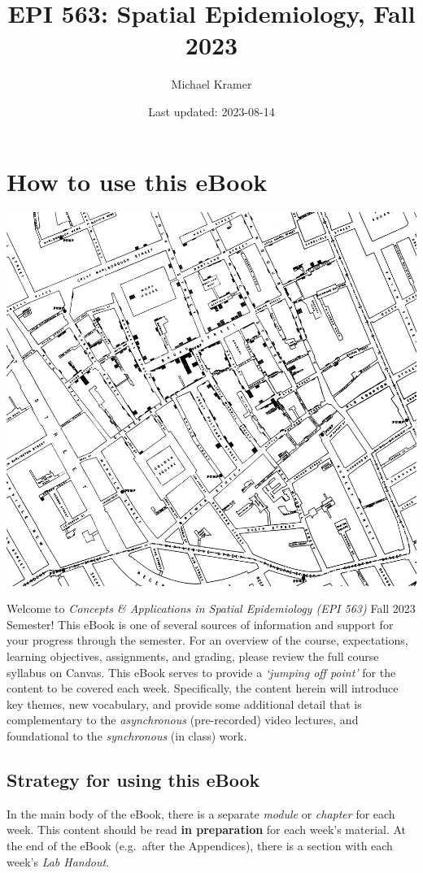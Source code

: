 \documentclass[
]{book}
\title{EPI 563: Spatial Epidemiology, Fall 2023}
\author{Michael Kramer}
\date{Last updated: 2023-08-14}
\begin{document}
\maketitle

{
\setcounter{tocdepth}{2}
\tableofcontents
}
\hypertarget{how-to-use-this-ebook}{%
\chapter*{How to use this eBook}\label{how-to-use-this-ebook}}

\begin{center}\includegraphics[width=0.5\linewidth]{images/John-Snows-cholera-map-of-009} \end{center}

Welcome to \emph{Concepts \& Applications in Spatial Epidemiology (EPI 563)} Fall 2023 Semester! This eBook is one of several sources of information and support for your progress through the semester. For an overview of the course, expectations, learning objectives, assignments, and grading, please review the full course syllabus on Canvas. This eBook serves to provide a \emph{`jumping off point'} for the content to be covered each week. Specifically, the content herein will introduce key themes, new vocabulary, and provide some additional detail that is complementary to the \emph{asynchronous} (pre-recorded) video lectures, and foundational to the \emph{synchronous} (in class) work.

\hypertarget{strategy-for-using-this-ebook}{%
\section*{Strategy for using this eBook}\label{strategy-for-using-this-ebook}}

In the main body of the eBook, there is a separate \emph{module} or \emph{chapter} for each week. This content should be read \textbf{in preparation} for each week's material. At the end of the eBook (e.g.~after the Appendices), there is a section with each week's \emph{Lab Handout}.
\end{document}
